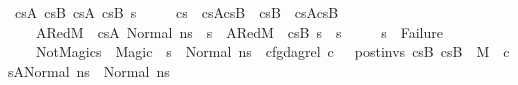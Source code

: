 \begin{isabellebody}
\ cs{}A\ cs{}B\ cs{}A{\isacharprime}{\kern0pt}\ cs{}B{\isacharprime}{\kern0pt}\ s{\isacharprime}{\kern0pt}{\isacharprime}{\kern0pt}\ \isanewline
\ \ \ \ {\isachardoublequoteopen}cs{}\ {\isacharequal}{\kern0pt}\ cs{}A{\isacharat}{\kern0pt}cs{}B{\isachardoublequoteclose}\ \ {\isachardoublequoteopen}cs{}B\ {\isacharequal}{\kern0pt}\ cs{}A{\isacharprime}{\kern0pt}{\isacharat}{\kern0pt}cs{}B{\isacharprime}{\kern0pt}{\isachardoublequoteclose}\ \ \isanewline
\ \ \ \ A{}Red{}{\isacharcolon}{\kern0pt}{\isachardoublequoteopen}{\isacharparenleft}{\kern0pt}M{\isacharcomma}{\kern0pt}{\isasymLambda}{\isacharcomma}{\kern0pt}{\isasymGamma}{\isacharcomma}{\kern0pt}{\isasymOmega}\ {\isasymturnstile}\ {\isasymlangle}cs{}A{\isacharcomma}{\kern0pt}\ Normal\ ns{}{\isasymrangle}\ {\isacharbrackleft}{\kern0pt}{\isasymrightarrow}{\isacharbrackright}{\kern0pt}\ s{\isacharprime}{\kern0pt}{\isacharprime}{\kern0pt}{\isacharparenright}{\kern0pt}{\isachardoublequoteclose}\ \ A{}Red{}{\isacharcolon}{\kern0pt}{\isachardoublequoteopen}{\isacharparenleft}{\kern0pt}M{\isacharcomma}{\kern0pt}{\isasymLambda}{\isacharcomma}{\kern0pt}{\isasymGamma}{\isacharcomma}{\kern0pt}{\isasymOmega}\ {\isasymturnstile}\ {\isasymlangle}cs{}B{\isacharcomma}{\kern0pt}\ s{\isacharprime}{\kern0pt}{\isacharprime}{\kern0pt}{\isasymrangle}\ {\isacharbrackleft}{\kern0pt}{\isasymrightarrow}{\isacharbrackright}{\kern0pt}\ s{\isacharprime}{\kern0pt}{\isacharparenright}{\kern0pt}{\isachardoublequoteclose}\ \isanewline
\ \ \ \ {\isachardoublequoteopen}s{\isacharprime}{\kern0pt}{\isacharprime}{\kern0pt}\ {\isasymnoteq}\ Failure{\isachardoublequoteclose}\ \isanewline
\ \ \ \ NotMagic{}{\isacharcolon}{\kern0pt}{\isachardoublequoteopen}{\isacharparenleft}{\kern0pt}s{\isacharprime}{\kern0pt}{\isacharprime}{\kern0pt}\ {\isasymnoteq}\ Magic\ {\isasymlongrightarrow}\ s{\isacharprime}{\kern0pt}{\isacharprime}{\kern0pt}\ {\isacharequal}{\kern0pt}\ Normal\ ns{}\ {\isasymand}\ cfg{\isacharunderscore}{\kern0pt}dag{\isacharunderscore}{\kern0pt}rel\ c\ {\isacharbrackleft}{\kern0pt}{\isacharbrackright}{\kern0pt}\ {\isacharbrackleft}{\kern0pt}{\isacharbrackright}{\kern0pt}\ post{\isacharunderscore}{\kern0pt}invs\ cs{}B\ cs{}B{\isacharprime}{\kern0pt}\ {\isasymand}\ M{\isacharcomma}{\kern0pt}{\isasymLambda}{\isacharcomma}{\kern0pt}{\isasymGamma}{\isacharcomma}{\kern0pt}{\isasymOmega}\ {\isasymturnstile}\ {\isasymlangle}cs{}A{\isacharprime}{\kern0pt}{\isacharcomma}{\kern0pt}Normal\ ns{}{\isacharprime}{\kern0pt}{\isasymrangle}\ {\isacharbrackleft}{\kern0pt}{\isasymrightarrow}{\isacharbrackright}{\kern0pt}\ Normal\ ns{}{\isacharprime}{\kern0pt}{\isacharparenright}{\kern0pt}{\isachardoublequoteclose}\isanewline

\end{isabellebody}
